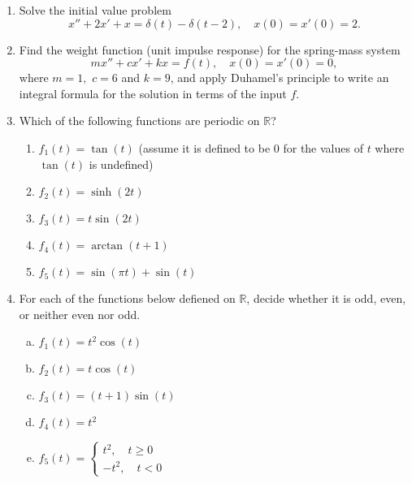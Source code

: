 \documentclass[11 pt]{article}
\newcommand{\R}{\mathbb{R}}
\begin{document}
\begin{enumerate}
\item Solve the initial value problem
\begin{equation}
    x''+2x'+x=\delta(t)-\delta(t-2), \quad x(0)=x'(0)=2.
\end{equation}


\item Find the weight function (unit impulse response)  for the spring-mass system
\begin{equation}
    mx''+cx'+kx=f(t), \quad x(0)=x'(0)=0,
\end{equation}
where $m=1, $ $c=6$ and $k=9$,
and apply Duhamel's principle to write an integral formula for the solution in terms of the input $f$.

\item Which of the following functions are periodic on $\R$?
\begin{enumerate}
    \item $f_1(t)=\tan(t)$ (assume it is defined to be $0$ for the values of $t$ where $\tan(t)$ is undefined)
    \item $f_2(t)=\sinh(2t)$
    \item $f_3(t)=t\sin(2t)$
    \item $f_4(t)=\arctan(t+1)$
    \item $f_5(t)=\sin(\pi t)+\sin(t)$
\end{enumerate}



\item \label{first} For each of the functions below defiened on $\mathbb{R}$, decide whether it is odd, even, or neither even nor odd.
\begin{enumerate}[(a)]
    \item $f_1(t)=t^2\cos(t)$
    \item $f_2(t)=t\cos(t)$
    \item $f_3(t)=(t+1)\sin(t)$
    \item $f_4(t)=t^2$
    \item $f_5(t)=\begin{cases}
        t^2,\quad t\geq 0\\
        -t^2,\quad t<0
    \end{cases}$
\end{enumerate}





\end{enumerate}
\end{document}
